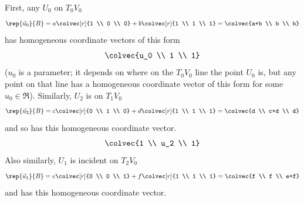\begin{exercises}
\begin{answer}
\begin{exparts}
          First, any $U_0$ on $T_0V_0$
          \begin{equation*}
            \rep{\vec{u}_0}{B}=a\colvec[r]{1 \\ 0 \\ 0}
                               +b\colvec[r]{1 \\ 1 \\ 1}
                              =\colvec{a+b \\ b \\ b}
          \end{equation*}
          has homogeneous coordinate vectors of this form
          \begin{equation*}
            \colvec{u_0 \\ 1 \\ 1}      
          \end{equation*}
          ($u_0$ is a parameter; it depends on where on the $T_0V_0$ line 
          the point $U_0$ is, but any point on that line has
          a homogeneous coordinate vector of this form for some $u_0\in\Re$).
          Similarly, $U_2$ is on $T_1V_0$
          \begin{equation*}
            \rep{\vec{u}_2}{B}=c\colvec[r]{0 \\ 1 \\ 0}
                                +d\colvec[r]{1 \\ 1 \\ 1}
                              =\colvec{d \\ c+d \\ d}
          \end{equation*}
          and so has this homogeneous coordinate vector.
          \begin{equation*}
            \colvec{1 \\ u_2 \\ 1}
          \end{equation*}
          Also similarly, $U_1$ is incident on $T_2V_0$
          \begin{equation*}
            \rep{\vec{u}_1}{B}=e\colvec[r]{0 \\ 0 \\ 1}
                                +f\colvec[r]{1 \\ 1 \\ 1}
                              =\colvec{f \\ f \\ e+f}  
          \end{equation*}
          and has this homogeneous coordinate vector.

\end{exparts}
\end{answer}
\end{exercises}
